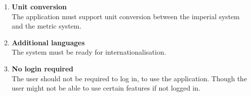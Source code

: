 \begin{enumerate}
  \item\label{req:unitconversion} \textbf{Unit conversion} \\
    The application must support unit conversion between the imperial system and the metric system.
    
  \item\label{req:additionallanguages} \textbf{Additional languages} \\
    The system must be ready for internationalisation.
  
  \item\label{req:Nologinrequired} \textbf{No login required} \\
    The user should not be required to log in, to use the application. Though the user might not be able to use certain features if not logged in.
\end{enumerate}